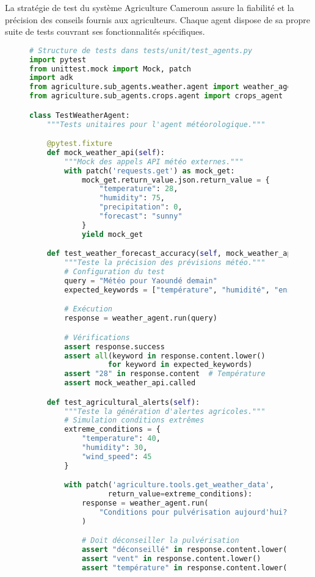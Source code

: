 La stratégie de test du système Agriculture Cameroun assure la fiabilité et la précision des conseils fournis aux agriculteurs. Chaque agent dispose de sa propre suite de tests couvrant ses fonctionnalités spécifiques.

\begin{figure}[h]
\centering
\begin{lstlisting}[language=Python, caption=Framework de tests unitaires pour agents ADK]
# Structure de tests dans tests/unit/test_agents.py
import pytest
from unittest.mock import Mock, patch
import adk
from agriculture.sub_agents.weather.agent import weather_agent
from agriculture.sub_agents.crops.agent import crops_agent

class TestWeatherAgent:
    """Tests unitaires pour l'agent météorologique."""

    @pytest.fixture
    def mock_weather_api(self):
        """Mock des appels API météo externes."""
        with patch('requests.get') as mock_get:
            mock_get.return_value.json.return_value = {
                "temperature": 28,
                "humidity": 75,
                "precipitation": 0,
                "forecast": "sunny"
            }
            yield mock_get

    def test_weather_forecast_accuracy(self, mock_weather_api):
        """Teste la précision des prévisions météo."""
        # Configuration du test
        query = "Météo pour Yaoundé demain"
        expected_keywords = ["température", "humidité", "ensoleillé"]

        # Exécution
        response = weather_agent.run(query)

        # Vérifications
        assert response.success
        assert all(keyword in response.content.lower()
                  for keyword in expected_keywords)
        assert "28" in response.content  # Température
        assert mock_weather_api.called

    def test_agricultural_alerts(self):
        """Teste la génération d'alertes agricoles."""
        # Simulation conditions extrêmes
        extreme_conditions = {
            "temperature": 40,
            "humidity": 30,
            "wind_speed": 45
        }

        with patch('agriculture.tools.get_weather_data',
                  return_value=extreme_conditions):
            response = weather_agent.run(
                "Conditions pour pulvérisation aujourd'hui?"
            )

            # Doit déconseiller la pulvérisation
            assert "déconseillé" in response.content.lower()
            assert "vent" in response.content.lower()
            assert "température" in response.content.lower()


\end{lstlisting}
\end{figure}
